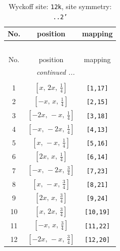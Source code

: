 \documentclass[fleqn,8pt]{jsarticle}
\begin{document}
\begin{longtable}{ccc}
\caption{Wyckoff site: {\tt 12k}, site symmetry: {\tt ..2'}}
 \\
 \hline \hline
No. & position & mapping \\ \hline \endfirsthead

\multicolumn{2}{l}{\tablename\ \thetable{}} \\
 \hline \hline
No. & position & mapping \\ \hline \endhead

 \hline \hline
\multicolumn{2}{r}{\footnotesize\it continued ...} \\ \endfoot

 \hline \hline
\multicolumn{2}{r}{} \\ \endlastfoot

1 & $\left[ x,\, 2 x,\, \frac{1}{4} \right]$ & {\tt [1,17]} \\ \hline
2 & $\left[ - x,\, x,\, \frac{1}{4} \right]$ & {\tt [2,15]} \\ \hline
3 & $\left[ - 2 x,\, - x,\, \frac{1}{4} \right]$ & {\tt [3,18]} \\ \hline
4 & $\left[ - x,\, - 2 x,\, \frac{1}{4} \right]$ & {\tt [4,13]} \\ \hline
5 & $\left[ x,\, - x,\, \frac{1}{4} \right]$ & {\tt [5,16]} \\ \hline
6 & $\left[ 2 x,\, x,\, \frac{1}{4} \right]$ & {\tt [6,14]} \\ \hline
7 & $\left[ - x,\, - 2 x,\, \frac{3}{4} \right]$ & {\tt [7,23]} \\ \hline
8 & $\left[ x,\, - x,\, \frac{3}{4} \right]$ & {\tt [8,21]} \\ \hline
9 & $\left[ 2 x,\, x,\, \frac{3}{4} \right]$ & {\tt [9,24]} \\ \hline
10 & $\left[ x,\, 2 x,\, \frac{3}{4} \right]$ & {\tt [10,19]} \\ \hline
11 & $\left[ - x,\, x,\, \frac{3}{4} \right]$ & {\tt [11,22]} \\ \hline
12 & $\left[ - 2 x,\, - x,\, \frac{3}{4} \right]$ & {\tt [12,20]} \\
\end{longtable}
\renewcommand{\arraystretch}{1.2}
\end{document}
